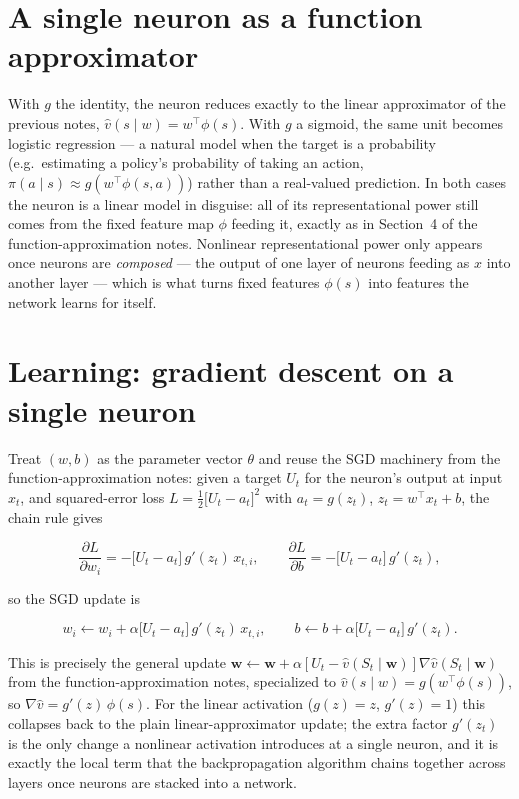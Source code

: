 \documentclass[11pt]{article}
\begin{document}
\section{A single neuron as a function approximator}

With $g$ the identity, the neuron reduces exactly to the linear
approximator of the previous notes, $\hat v(s\mid w) = w^{\top}\phi(s)$.
With $g$ a sigmoid, the same unit becomes logistic regression — a natural
model when the target is a probability (e.g.\ estimating a policy's
probability of taking an action, $\pi(a\mid s) \approx g(w^\top\phi(s,a))$)
rather than a real-valued prediction. In both cases the neuron is a linear
model in disguise: all of its representational power still comes from the
fixed feature map $\phi$ feeding it, exactly as in Section~4 of the
function-approximation notes. Nonlinear representational power only
appears once neurons are \emph{composed} — the output of one layer of
neurons feeding as $x$ into another layer — which is what turns fixed
features $\phi(s)$ into features the network learns for itself.

\section{Learning: gradient descent on a single neuron}

Treat $(w, b)$ as the parameter vector $\theta$ and reuse the SGD
machinery from the function-approximation notes: given a target $U_t$ for
the neuron's output at input $x_t$, and squared-error loss
$L = \frac{1}{2}\big[U_t - a_t\big]^2$ with $a_t = g(z_t)$,
$z_t = w^\top x_t + b$, the chain rule gives

\[
    \frac{\partial L}{\partial w_i} = -\big[U_t - a_t\big]\, g'(z_t)\, x_{t,i},
    \qquad
    \frac{\partial L}{\partial b} = -\big[U_t - a_t\big]\, g'(z_t),
\]

so the SGD update is

\[
    w_i \leftarrow w_i + \alpha \big[U_t - a_t\big]\, g'(z_t)\, x_{t,i}, \qquad
    b \leftarrow b + \alpha \big[U_t - a_t\big]\, g'(z_t).
\]

This is precisely the general update
$\mathbf{w} \leftarrow \mathbf{w} + \alpha[U_t - \hat v(S_t\mid\mathbf{w})]
\nabla \hat v(S_t\mid\mathbf{w})$ from the function-approximation notes,
specialized to $\hat v(s\mid w) = g(w^\top\phi(s))$, so
$\nabla \hat v = g'(z)\,\phi(s)$. For the linear activation ($g(z)=z$,
$g'(z)=1$) this collapses back to the plain linear-approximator update;
the extra factor $g'(z_t)$ is the only change a nonlinear activation
introduces at a single neuron, and it is exactly the local term that the
backpropagation algorithm chains together across layers once neurons are
stacked into a network.
\end{document}
